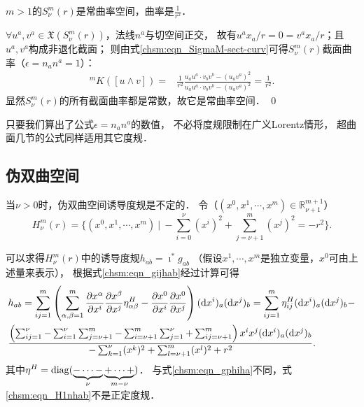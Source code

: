 \begin{example}\label{chsm:exm_SK}
    $m>1$的$S^m_\nu(r)$是常曲率空间，曲率是$\frac{1}{r^2}$．
\end{example}
$\forall u^a,v^a\in \mathfrak{X}(S^m_\nu(r))$，法线$n^a$与切空间正交，
故有$ u^ax_a/r =0 = v^a x_a/r$；且$u^a,v^a$构成非退化截面；
则由式\eqref{chsm:eqn_SigmaM-sect-curv}可得$S^m_\nu(r)$截面曲率（$\epsilon=n_a n^a=1$）：
\begin{align*}   
    {}^{m} K([u\wedge v]) 
    =&\frac{1}{r^2}
    \frac{  {u}_a{u}^a \cdot {v}_b{v}^b - ({u}_a{v}^a)^2 }
    {{u}_a{u}^a \cdot {v}_b{v}^b - ({u}_a{v}^a)^2 }
    =\frac{1}{r^2} .
\end{align*}
显然$S^m_\nu(r)$的所有截面曲率都是常数，故它是常曲率空间．
\qed

\begin{remark}
	只要我们算出了公式$\epsilon=n_a n^a$的数值，
	不必将度规限制在广义Lorentz情形，
	超曲面几节的公式同样适用其它度规．
\end{remark}


\subsection{伪双曲空间}\label{chsm:sec_hyperbolic-H1n}
当$\nu>0$时，伪双曲空间诱导度规是不定的．
令（$(x^0,x^1,\cdots,x^{m})\in \mathbb{R}^{m+1}_{\nu+1}$）
\begin{equation}\label{chsm:eqn_hyperbolic-H1n} 
    H^m_{\nu}(r) =  \bigl\{(x^0,x^1,\cdots,x^{m})\ |\  
    -\sum_{i=0}^{\nu} (x^i)^2+\sum_{j=\nu+1}^{m} (x^j)^2 = -r^2 \bigr\} . 
\end{equation} 


可以求得$H^m_{\nu}(r)$中的诱导度规$h_{ab}=\imath ^* g_{ab}$
（假设$x^1,\cdots,x^{m}$是独立变量，$x^0$可由上述量来表示），
根据式\eqref{chsm:eqn_gijhab}经过计算可得
\begin{align}
    &h_{ab}= \sum_{ij=1}^{m}\left(\sum_{\alpha,\beta=1}^{m}\frac{\partial x^\alpha}{\partial x^i}
    \frac{\partial x^\beta}{\partial x^j}\eta^H_{\alpha\beta} 
    -\frac{\partial x^0}{\partial x^i}  \frac{\partial x^0}{\partial x^j} \right) 
    ({\rm d} x^i)_a ({\rm d} x^j)_b  
    = \sum_{ij=1}^{m} \eta^H_{ij} ({\rm d} x^i)_a ({\rm d} x^j)_b - \notag \\
    &\frac{ \left(\sum_{ij=1}^{\nu}  - \sum_{i=1}^{\nu}\sum_{j=\nu+1}^{m}
        -\sum_{i=\nu+1}^{m}\sum_{j=1}^{\nu} +\sum_{ij=\nu+1}^{m} \right)
        x^i x^j ({\rm d} x^i)_a ({\rm d} x^j)_b }
    {-\sum_{k=1}^{\nu}(x^k)^2+\sum_{l=\nu+1}^{m}(x^l)^2 + r^2}  . \label{chsm:eqn_H1nhab}
\end{align} %
其中$\eta^H={\rm diag}(\underbrace{-\cdots-}_{\nu} \underbrace{+\cdots+}_{m-\nu})$．
与式\eqref{chsm:eqn_gphiha}不同，式\eqref{chsm:eqn_H1nhab}不是正定度规．




